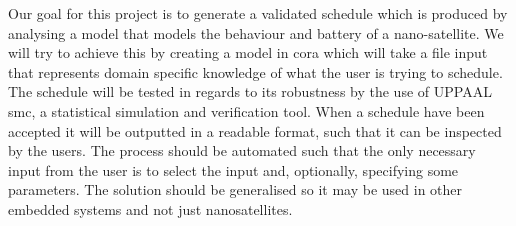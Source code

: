 Our goal for this project is to generate a validated schedule which is produced by analysing a model that models the behaviour and battery of a nano-satellite. 
We will try to achieve this by creating a model in \gls{cora} which will take a file input that represents domain specific knowledge of what the user is trying to schedule.
The schedule will be tested in regards to its robustness by the use of UPPAAL \gls{smc}, a statistical simulation and verification tool. 
When a schedule have been accepted it will be outputted in a readable format, such that it can be inspected by the users. 
The process should be automated such that the only necessary input from the user is to select the input and, optionally, specifying some parameters. 
The solution should be generalised so it may be used in other embedded systems and not just nanosatellites.





